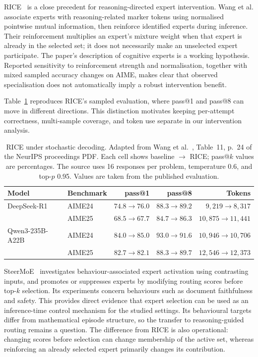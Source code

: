 \documentclass[12pt,a4paper,twoside,openright]{book}
\begin{document}
RICE~\cite{wang2025rice} is a close precedent for reasoning-directed expert
intervention. Wang et al. associate experts with reasoning-related
marker tokens using normalised pointwise mutual information, then reinforce
identified experts during inference. Their reinforcement multiplies an
expert's mixture weight when that expert is already in the selected set;
it does not necessarily make an unselected expert participate. The paper's
description of cognitive experts is a working hypothesis. Reported
sensitivity to reinforcement strength and normalisation, together with
mixed sampled accuracy changes on AIME, makes clear that observed
specialisation does not automatically imply a robust intervention benefit.

Table~\ref{tab:related-rice-sampling} reproduces RICE's sampled evaluation,
where pass@1 and pass@8 can move in different directions. This distinction
motivates keeping per-attempt correctness, multi-sample coverage, and token
use separate in our intervention analysis.

\begin{table}[!ht]
  \centering
  \small
  \setlength{\tabcolsep}{4pt}
  \caption[RICE under stochastic decoding]{RICE under stochastic decoding.
  Adapted from Wang et al.~\cite{wang2025rice}, Table~11, p.~24 of the
  NeurIPS proceedings PDF. Each cell shows baseline $\rightarrow$ RICE;
  pass@$k$ values are percentages. The source uses 16 responses per problem,
  temperature 0.6, and top-$p$ 0.95. Values are taken from the published evaluation.}
  \label{tab:related-rice-sampling}
  \begin{tabular}{@{}llrrr@{}}
    \toprule
    Model & Benchmark & pass@1 & pass@8 & Tokens \\
    \midrule
    DeepSeek-R1 & AIME24 & $74.8\to76.0$ & $88.3\to89.2$ & $9{,}219\to8{,}317$ \\
                & AIME25 & $68.5\to67.7$ & $84.7\to86.3$ & $10{,}875\to11{,}441$ \\
    \addlinespace
    Qwen3-235B-A22B & AIME24 & $84.0\to85.0$ & $93.0\to91.6$ & $10{,}946\to10{,}706$ \\
                    & AIME25 & $82.7\to82.1$ & $88.3\to89.7$ & $12{,}546\to12{,}373$ \\
    \bottomrule
  \end{tabular}
\end{table}

SteerMoE~\cite{fayyaz2025steermoe} investigates behaviour-associated expert
activation using contrasting inputs, and promotes or suppresses experts by
modifying routing scores before top-$k$ selection. Its experiments concern behaviours
such as document faithfulness and safety. This provides direct evidence that
expert selection can be used as an inference-time control mechanism for the
studied settings. Its behavioural targets differ from mathematical episode
structure, so the transfer to reasoning-guided routing remains a question.
The difference from RICE is also operational: changing scores before
selection can change membership of the active set, whereas reinforcing an
already selected expert primarily changes its contribution.
\end{document}
